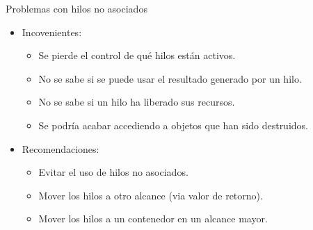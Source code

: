 \begin{frame}[t]{Problemas con hilos no asociados}
\begin{itemize}
  \item \alert{Incovenientes}:
    \begin{itemize}
      \item Se pierde el control de qué hilos están activos.
      \item No se sabe si se puede usar el resultado generado por un hilo.
      \item No se sabe si un hilo ha liberado sus recursos.
      \item Se podría acabar accediendo a objetos que han sido destruidos.
    \end{itemize}
  \pause
  \vspace{1em}
  \item \alert{Recomendaciones}:
    \begin{itemize}
      \item Evitar el uso de hilos no asociados.
      \item Mover los hilos a otro alcance (via valor de retorno).
      \item Mover los hilos a un contenedor en un alcance mayor.
    \end{itemize}
\end{itemize}
\end{frame}


